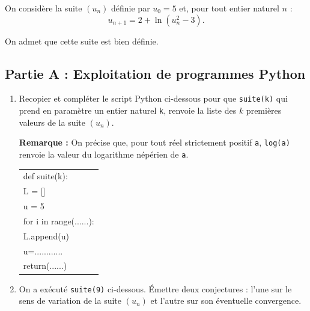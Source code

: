 \medskip
	On considère la suite $(u_{n})$ définie par $u_{0}=5$ et, pour tout entier naturel $n$ :
	$$
	u_{n+1}=2+\ln \left(u_{n}^{2}-3\right).
	$$

	On admet que cette suite est bien définie.

	\subsection*{Partie A : Exploitation de programmes Python}

	\begin{enumerate}
		\item Recopier et compléter le script Python ci-dessous pour que \texttt{suite(k)} qui prend en paramètre un entier naturel \texttt{k}, renvoie la liste des $k$ premières valeurs de la suite $(u_{n})$.

		\medskip

		\textbf{Remarque :} On précise que, pour tout réel strictement positif \texttt{a}, \texttt{log(a)} renvoie la valeur du logarithme népérien de \texttt{a}.















		\begin{center}
		\begin{ttfamily}
		\begin{tabularx}{0.6\linewidth}{|X|}\hline
			def suite(k):\\
			\quad	L = []\\
			\quad	u = 5\\
			\quad	for i in range(......):\\
			\qquad	L.append(u)\\
			\qquad	u=............\\
			\quad	return(......)\\ \hline
		\end{tabularx}
		\end{ttfamily}
		\end{center}
		
		\item On a exécuté \texttt{suite(9)} ci-dessous. Émettre deux conjectures : l'une sur le sens de variation de la suite $(u_{n})$ et l'autre sur son éventuelle convergence.

\begin{center}
\begin{ttfamily}
		

\end{ttfamily}
\end{center}
\end{enumerate}
